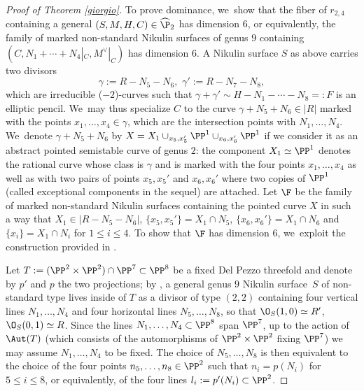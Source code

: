 \begin{proof}[Proof of Theorem \ref{giorgio}]
\Changel
To prove dominance, we~show that the fiber of $r_{2,4} $ containing a general $(S,M,H,C)\in\widehat\P_{2}$ has dimension $6$, or equivalently, the family of marked non-standard Nikulin surfaces of genus $9$ containing $(C,N_1+\cdots +N_4|_C,M^\vee|_C)$ has dimension $6$. A Nikulin surface $S$ as above carries two divisors\vspace*{-3pt}
\begin{equation*}
\gamma:=R-N_5-N_6,\,\,\gamma':=R-N_7-N_8,
\end{equation*}
which are irreducible ($-2$)-curves such that $\gamma+\gamma'\sim H-N_1-\cdots-N_8=:F$ is an elliptic pencil. We~may thus specialize $C$ to the curve $\gamma+N_5+N_6\in |R|$ marked with the points $x_1,\ldots,x_4\in \gamma$, which are the intersection points with $N_1,\ldots, N_4$. We~denote $\gamma+N_5+N_6$ by $X=X_1\cup_{x_5,x_5'}\PP^1\cup_{x_6,x_6'}\PP^1$ if we consider it as an abstract pointed semistable curve of genus $2$: the component $X_1\simeq\PP^1$ denotes the rational curve whose class is $\gamma$ and is marked with the four points $x_1,\ldots,x_4$ as well as with two pairs of points $x_5,x_5'$ and $x_6,x_6'$ where two copies of $\PP^1$ (called exceptional components in the sequel) are attached. Let $\F$ be the family of marked non-standard Nikulin surfaces containing the pointed curve $X$ in such a way that $X_1\in |R-N_5-N_6|$, $\{x_5,x_5'\}=X_1\cap N_5$, $\{x_6,x_6'\}=X_1\cap N_6$ and $\{x_i\}=X_1\cap N_i$ for $1\leq i\leq 4$. To show that $\F$ has dimension $6$, we~exploit the construction provided in \cite[\S 4]{KLV2}.

Let $T:=(\PP^2\times \PP^2)\cap\PP^7\subset\PP^8$ be a fixed Del Pezzo threefold and denote by $p'$ and $p$ the two projections; by \cite[Prop.\,4.3]{KLV2}, a general genus $9$ Nikulin surface~$S$ of non-standard type lives inside of $T$ as a divisor of type $(2,2)$ containing four vertical lines $N_1,\ldots, N_4$ and four horizontal lines $N_5,\ldots, N_8$, so that $\O_S(1,0)\simeq R'$, $\O_S(0,1)\simeq R$. Since the lines $N_1,\ldots, N_4\subset \PP^8$ span $\PP^7$, up to the action of $\Aut(T)$ (which consists of the automorphisms of $\PP^2\times \PP^2$ fixing $\PP^7$) we may assume $N_1,\ldots, N_4$ to be fixed. The choice of $N_5,\ldots,N_8$ is then equivalent to the choice of the four points $n_5,\ldots, n_8\in \PP^2$ such that $n_i=p(N_i)$ for $5\leq i\leq 8$, or equivalently, of the four lines $l_i:=p'(N_i)\subset\PP^2$.\enlargethispage{.5\baselineskip}%


\end{proof}
